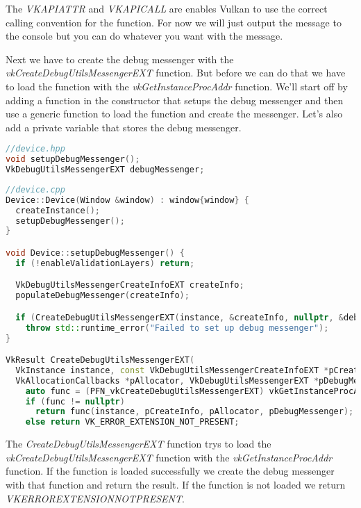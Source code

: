 \documentclass[12pt]{report} \usepackage{preamble}
\begin{document}
The \textit{VKAPI\textunderscore ATTR} and \textit{VKAPI\textunderscore CALL} are enables Vulkan to
use the correct calling convention for the function. For now we will just output the message to the
console but you can do whatever you want with the message.

Next we have to create the debug messenger with the \textit{vkCreateDebugUtilsMessengerEXT} function.
But before we can do that we have to load the function with the \textit{vkGetInstanceProcAddr} function.
We'll start off by adding a function in the constructor that setups the debug messenger and then
use a generic function to load the function and create the messenger. Let's also add a private
variable that stores the debug messenger.

\newpage

\begin{lstlisting}[language=C++]
//device.hpp
void setupDebugMessenger();
VkDebugUtilsMessengerEXT debugMessenger;
\end{lstlisting}

\begin{lstlisting}[language=C++]
//device.cpp
Device::Device(Window &window) : window{window} {
  createInstance();
  setupDebugMessenger();
}

void Device::setupDebugMessenger() {
  if (!enableValidationLayers) return;

  VkDebugUtilsMessengerCreateInfoEXT createInfo;
  populateDebugMessenger(createInfo);

  if (CreateDebugUtilsMessengerEXT(instance, &createInfo, nullptr, &debugMessenger) != VK_SUCCESS)
    throw std::runtime_error("Failed to set up debug messenger");
}

VkResult CreateDebugUtilsMessengerEXT(
  VkInstance instance, const VkDebugUtilsMessengerCreateInfoEXT *pCreateInfo,
  VkAllocationCallbacks *pAllocator, VkDebugUtilsMessengerEXT *pDebugMessenger) {
    auto func = (PFN_vkCreateDebugUtilsMessengerEXT) vkGetInstanceProcAddr(instance, "vkCreateDebugUtilsMessengerEXT");
    if (func != nullptr) 
      return func(instance, pCreateInfo, pAllocator, pDebugMessenger);
    else return VK_ERROR_EXTENSION_NOT_PRESENT;
\end{lstlisting}

The \textit{CreateDebugUtilsMessengerEXT} function trys to load the \textit{vkCreateDebugUtilsMessengerEXT}
function with the \textit{vkGetInstanceProcAddr} function. If the function is loaded successfully
we create the debug messenger with that function and return the result. If the function is not loaded
we return \textit{VK\textunderscore ERROR\textunderscore EXTENSION\textunderscore NOT\textunderscore PRESENT}.
\end{document}
